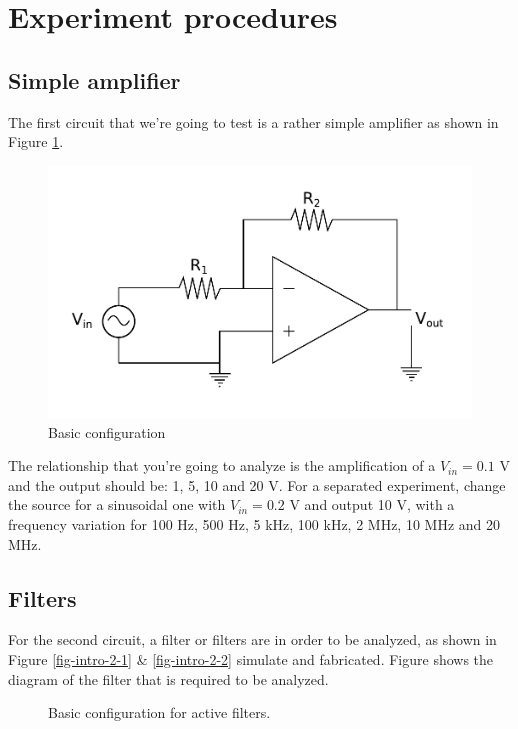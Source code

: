 \documentclass{article}
\begin{document}
\newpage

\section{Experiment procedures}

\subsection{Simple amplifier}
The first circuit that we’re going to test is a rather simple amplifier as shown in Figure \ref{fig-intro-1}.

\begin{figure}[htbp]
	\centering
	\includegraphics[width=0.5\linewidth]{imgs/intro_1.png}
	\caption{Basic configuration}
	\label{fig-intro-1}
\end{figure}

The relationship that you’re going to analyze is the amplification of a $V_{in}=0.1$ V and the
output should be: 1, 5, 10 and 20 V. For a separated experiment, change the source
for a sinusoidal one with $V_{in}=0.2$ V and output 10 V, with a frequency variation for 100
Hz, 500 Hz, 5 kHz, 100 kHz, 2 MHz, 10 MHz and 20 MHz.


\subsection{Filters}
For the second circuit, a filter or filters are in order to be analyzed, as shown in Figure \ref{fig-intro-2-1} \& \ref{fig-intro-2-2} simulate and fabricated. Figure shows the diagram of the filter that is required
to be analyzed.

\begin{figure}[htbp]
	\centering
	\caption{Basic configuration for active filters.}
	\label{fig-intro-2}
\end{figure}
\end{document}

